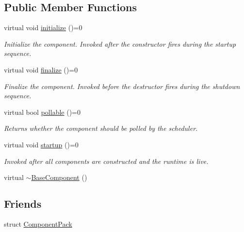 \subsection*{Public Member Functions}
\begin{DoxyCompactItemize}
\item 
virtual void \hyperlink{structvt_1_1runtime_1_1component_1_1_base_component_ae361291ee8a37325580e59fb4030bc3a}{initialize} ()=0
\begin{DoxyCompactList}\small\item\em Initialize the component. Invoked after the constructor fires during the startup sequence. \end{DoxyCompactList}\item 
virtual void \hyperlink{structvt_1_1runtime_1_1component_1_1_base_component_ac03e2177ad2e26b1b8cb94c7e47e3eff}{finalize} ()=0
\begin{DoxyCompactList}\small\item\em Finalize the component. Invoked before the destructor fires during the shutdown sequence. \end{DoxyCompactList}\item 
virtual bool \hyperlink{structvt_1_1runtime_1_1component_1_1_base_component_ab651a49e6d4d3d8ca9e82a6b4b10af66}{pollable} ()=0
\begin{DoxyCompactList}\small\item\em Returns whether the component should be polled by the scheduler. \end{DoxyCompactList}\item 
virtual void \hyperlink{structvt_1_1runtime_1_1component_1_1_base_component_a8bf92f9f0a7027abf7deaefa2e7f5202}{startup} ()=0
\begin{DoxyCompactList}\small\item\em Invoked after all components are constructed and the runtime is live. \end{DoxyCompactList}\item 
virtual \hyperlink{structvt_1_1runtime_1_1component_1_1_base_component_a9190b5cb499f9cfdacc1e0bd98a1805a}{$\sim$\+Base\+Component} ()
\end{DoxyCompactItemize}
\subsection*{Friends}
\begin{DoxyCompactItemize}
\item 
struct \hyperlink{structvt_1_1runtime_1_1component_1_1_base_component_a82123f8d3dae68c38bd13d269d00b4c5}{Component\+Pack}
\end{DoxyCompactItemize}
